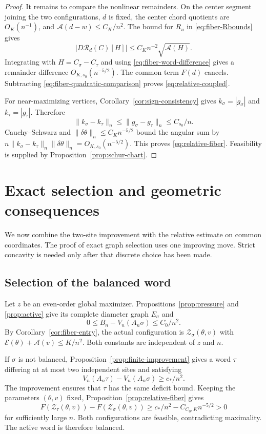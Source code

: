 \documentclass[11pt,reqno]{amsart}
\numberwithin{equation}{section}
\theoremstyle{definition}
\theoremstyle{remark}
\newcommand{\A}{\mathcal A}
\newcommand{\E}{\mathcal E}
\newcommand{\norm}[1]{\lVert #1\rVert}
\newcommand{\dd}{\delta}
\begin{document}
\begin{proof}
It remains to compare the nonlinear remainders. On the center segment joining the two configurations, $d$ is fixed, the center chord quotients are $O_K(n^{-1})$, and
$\A(d-w)\le C_K/n^2$. The bound for $R_u$ in
\eqref{eq:fiber-Rbounds} gives
\[
 |D\mathscr R_d(C)[H]|\le C_Kn^{-2}\sqrt{\A(H)}.
\]
Integrating with $H=C_\sigma-C_\tau$ and using
\eqref{eq:fiber-word-difference} gives a remainder difference
$O_{K,s_0}(n^{-5/2})$. The common term $F(d)$ cancels. Subtracting
\eqref{eq:fiber-quadratic-comparison} proves \eqref{eq:relative-coupled}.

For near-maximizing vertices, Corollary~\ref{cor:sign-consistency} gives
$k_\sigma=|g_\sigma|$ and $k_\tau=|g_\tau|$. Therefore
\[
 \norm{k_\sigma-k_\tau}_n\le\norm{g_\sigma-g_\tau}_n\le C_{s_0}/n.
\]
Cauchy--Schwarz and $\norm{\dd\theta}_n\le C_Kn^{-5/2}$ bound the angular sum by
$n\norm{k_\sigma-k_\tau}_n\norm{\dd\theta}_n=O_{K,s_0}(n^{-5/2})$.
This proves \eqref{eq:relative-fiber}. Feasibility is supplied by
Proposition~\ref{prop:schur-chart}.
\end{proof}


\section{Exact selection and geometric consequences}\label{sec:exact}
We now combine the two-site improvement with the relative estimate on common coordinates. The proof of exact graph selection uses one improving move. Strict concavity is needed only after that discrete choice has been made.

\subsection{Selection of the balanced word}
Let $z$ be an even-order global maximizer. Propositions~\ref{prop:pressure} and \ref{prop:active} give its complete diameter graph $E_\sigma$ and
\[
 0\le B_n-V_n(A_n\sigma)\le C_0/n^2.
\]
By Corollary~\ref{cor:fiber-entry}, the actual configuration is
$\mathcal Z_\sigma(\theta,v)$ with $\E(\theta)+\A(v)\le K/n^2$. Both constants are independent of $z$ and $n$.

If $\sigma$ is not balanced, Proposition~\ref{prop:finite-improvement} gives a word $\tau$ differing at at most two independent sites and satisfying
\[
 V_n(A_n\tau)-V_n(A_n\sigma)\ge c_*/n^2.
\]
The improvement ensures that $\tau$ has the same deficit bound. Keeping the parameters $(\theta,v)$ fixed, Proposition~\ref{prop:relative-fiber} gives
\begin{equation}\label{eq:final-integer-comparison}
 F(\mathcal Z_\tau(\theta,v))-F(\mathcal Z_\sigma(\theta,v))
 \ge c_*/n^2-C_{C_0,K}n^{-5/2}>0
\end{equation}
for sufficiently large $n$. Both configurations are feasible, contradicting maximality. The active word is therefore balanced.
\end{document}
